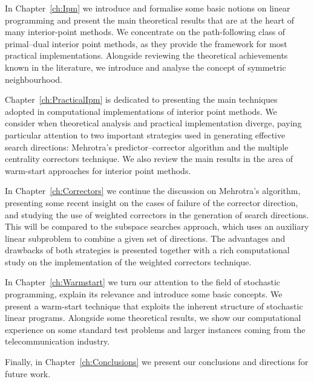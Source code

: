 In Chapter~\ref{ch:Ipm} we introduce and formalise some basic
notions on linear programming and present the main theoretical results 
that are at the heart of many interior-point methods. 
We concentrate on the path-following class of
primal--dual interior point methods, as they provide the framework for 
most practical implementations.
Alongside reviewing the theoretical achievements known in the
literature, we introduce and analyse the concept of 
symmetric neighbourhood.

Chapter~\ref{ch:PracticalIpm} is dedicated to presenting
the main techniques adopted in computational implementations of
interior point methods.
We consider when
theoretical analysis and practical implementation diverge,
paying particular attention to two important strategies used 
in generating effective search directions: 
Mehrotra's predictor--corrector algorithm and the
multiple centrality correctors technique.
We also review the main results in the area of warm-start
approaches for interior point methods.

In Chapter~\ref{ch:Correctors} we continue the discussion on
Mehrotra's algorithm, presenting some recent insight on the
cases of failure of the corrector direction, and studying the use of
weighted correctors in the generation of search directions. This will
be compared to the subspace searches approach, which uses
an auxiliary linear subproblem to combine
a given set of directions. The advantages
and drawbacks of both strategies is presented together with
a rich computational study on the implementation of the
weighted correctors technique.

In Chapter~\ref{ch:Warmstart} we turn our attention to the field
of stochastic programming, explain its relevance and introduce some
basic concepts.
We present a warm-start technique
that exploits the inherent structure of stochastic linear programs.
Alongside some theoretical results, we show our computational
experience on some standard test problems and larger instances coming
from the telecommunication industry.

Finally, in Chapter~\ref{ch:Conclusions} we present our conclusions
and directions for future work.
